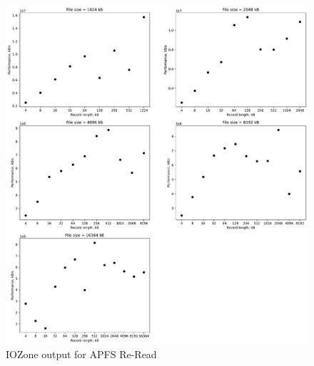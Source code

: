 \begin{figure}[!htb]
	\label{fig:app_benchapfss_re_read}
	\begin{center}
		\includegraphics[width=1.0\textwidth]{figures/benchmarking/local/Re-Read.pdf}
	\end{center}
	\caption{IOZone output for \gls{APFS} Re-Read}
\end{figure}

